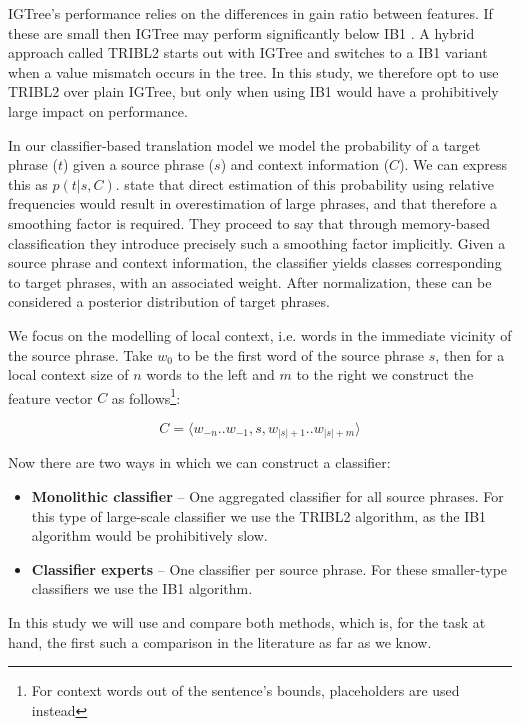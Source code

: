 IGTree's performance relies on the differences in gain ratio between
features. If these are small then IGTree may perform significantly below IB1
\citep{TIMBL}. A hybrid approach called TRIBL2 \citep{TIMBL} starts out with
IGTree and switches to a IB1 variant when a value mismatch occurs in the tree.
In this study, we therefore opt to use TRIBL2 over plain IGTree, but only when
using IB1 would have a prohibitively large impact on performance.

In our classifier-based translation model we model the probability of a target
phrase ($t$) given a source phrase ($s$) and context information ($C$). We can
express this as $p(t|s,C)$.  \cite{Stroppa+07} state that direct estimation of
this probability using relative frequencies would result in overestimation of
large phrases, and that therefore a smoothing factor is required. They proceed
to say that through memory-based classification they introduce precisely such a
smoothing factor implicitly. Given a source phrase and context information, the
classifier yields classes corresponding to target phrases, with an associated
weight. After normalization, these can be considered a posterior distribution
of target phrases.

We focus on the modelling of local context, i.e. words in the
immediate vicinity of the source phrase. Take $w_0$ to be the first word of
the source phrase $s$, then for a local context size of $n$ words to the left and
$m$ to the right we construct the feature vector $C$ as
follows\footnote{For context words out of the sentence's bounds, placeholders
are used instead}:

\begin{equation}
  C = \langle w_{-n} .. w_{-1} , s , w_{|s|+1} .. w_{|s|+m} \rangle
\end{equation}

Now there are two ways in which we can construct a classifier:

\begin{itemize}
  \item \textbf{Monolithic classifier} -- One aggregated classifier for all
    source phrases. For this type of large-scale classifier we use the TRIBL2 algorithm, as the IB1 algorithm would be prohibitively slow.
  \item \textbf{Classifier experts} -- One classifier per source phrase. For these smaller-type classifiers we use the IB1 algorithm.
\end{itemize}

In this study we will use and compare both methods, which is, for the task at
hand, the first such a comparison in the literature as far as we know.

